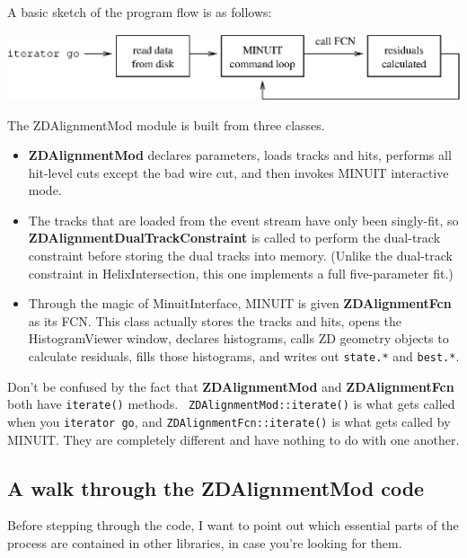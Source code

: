 \documentclass[12pt]{article}
\begin{document}
A basic sketch of the program flow is as follows:
\begin{center}
  \vspace{0.2 cm}
  \includegraphics[width=\linewidth]{sketch.eps}
\end{center}

The ZDAlignmentMod module is built from three classes.
\begin{itemize}

  \item {\bf ZDAlignmentMod} declares parameters, loads tracks and
  hits, performs all hit-level cuts except the bad wire cut, and then
  invokes MINUIT interactive mode.

  \item The tracks that are loaded from the event stream have only
  been singly-fit, so {\bf ZDAlignmentDualTrackConstraint} is called
  to perform the dual-track constraint before storing the dual tracks
  into memory.  (Unlike the dual-track constraint in
  HelixIntersection, this one implements a full five-parameter fit.)

  \item Through the magic of MinuitInterface, MINUIT is given
  {\bf ZDAlignmentFcn} as its FCN.  This class actually stores the
  tracks and hits, opens the HistogramViewer window, declares
  histograms, calls ZD geometry objects to calculate residuals, fills
  those histograms, and writes out {\tt state.*} and {\tt best.*}.

\end{itemize}

Don't be confused by the fact that {\bf ZDAlignmentMod} and {\bf
ZDAlignmentFcn} both have {\tt iterate()} methods.  {\tt
ZDAlignmentMod::iterate()} is what gets called when you {\tt iterator
go}, and {\tt ZDAlignmentFcn::iterate()} is what gets called by
MINUIT.  They are completely different and have nothing to do with one
another.

\subsection{A walk through the ZDAlignmentMod code}

Before stepping through the code, I want to point out which essential
parts of the process are contained in other libraries, in case you're
looking for them.
\end{document}
